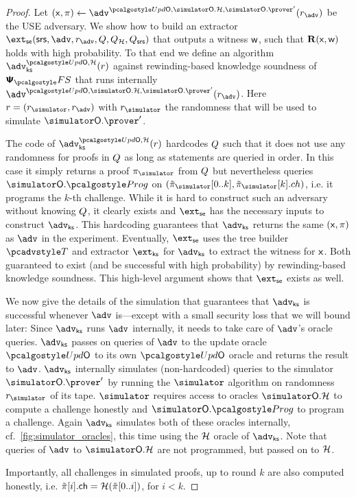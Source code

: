 \begin{proof}	
	Let $(\inp, \zkproof) \gets \advse^{\initU, \simOH, \simOP'}(r_{\advse})$ be the USE adversary. We show how to build an extractor $\extse (\srs, \advse, r_{\advse}, \Qsim, \Qro, \Qsrs)$ that outputs a witness $\mathsf{w}$, such that $\mathbf{R}(\mathsf{x}, \mathsf{w})$ holds with high probability. To that end we define an algorithm $\advcss^{\initU,\ro}(r)$ against rewinding-based knowledge soundness of $\psfs$ that runs internally $\advse^{\initU, \simOH, \simOP'}(r_{\advse})$. Here $r = (\rsim, r_{\advse})$ with $\rsim$ the randomness that will be used to simulate $\simOP'$. 

	The code of $\advcss^{\initU,\ro}(r)$ hardcodes $Q$ such that it does not use any randomness for proofs in $Q$ as long as statements are queried in order. In this case it simply returns a proof $\zkproofs$ from $Q$ but nevertheless queries $\simOHprog$ on $(\tzkproofs[0..k],\tzkproofs[k].ch)$, i.e. it programs the $k$-th challenge. While it is hard to construct such an adversary without knowing $Q$, it clearly exists and $\extse$ has the necessary inputs to construct $\advcss$. This hardcoding guarantees that $\advcss$ returns the same $(\mathsf{x},\pi)$ as $\advse$ in the experiment.
	Eventually, $\extse$ uses the tree builder $\tdv$ and extractor $\extcss$ for $\advcss$ to extract the witness for $\mathsf{x}$. Both guaranteed to exist (and be successful with high probability) by rewinding-based knowledge soundness. This high-level argument shows that $\extse$ exists as well.
	
	We now give the details of the simulation that guarantees that $\advcss$ is successful whenever $\advse$ is---except with a small security loss that we will bound later:
	Since $\advcss$ runs $\advse$ internally, it needs to take care of $\advse$'s oracle queries.
	$\advcss$ passes on queries of $\advse$ to the update oracle $\initU$ to its own $\initU$ oracle and returns the result to $\advse$.
	$\advcss$ internally simulates (non-hardcoded) queries to the simulator $\simOP'$ by running the $\simulator$ algorithm on randomness $\rsim$ of its tape. $\simulator$ requires access to oracles $\simOH$ to compute a challenge honestly and $\simOHprog$ to program a challenge. Again $\advcss$ simulates both of these oracles internally, cf.~\cref{fig:simulator_oracles}, this time using the $\mathcal{H}$ oracle of $\advcss$. 	Note that queries of $\advse$ to $\simOH$ are not programmed, but passed on to $\mathcal{H}$. 
	
	Importantly, all challenges in simulated proofs, up to round $k$ are also computed honestly, i.e. $\tilde{\pi}[i].\mathsf{ch} = \mathcal{H}(\tilde{\pi}[0..i])$, for $i < k$.


\end{proof}
